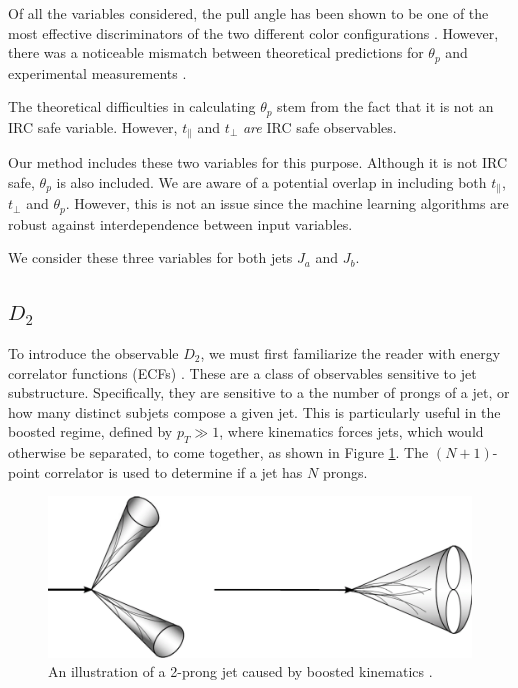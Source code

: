 \documentclass[10pt,a4paper]{book}
\begin{document}
Of all the variables considered, the pull angle has been shown to be one of the most effective discriminators of the two different color configurations \cite{Gallicchio:2010sw}. However, there was a noticeable mismatch between theoretical predictions for $\theta_p$ and experimental measurements \cite{Larkoski:2019urm}. 

The theoretical difficulties in calculating $\theta_p$ stem from the fact that it is not an IRC safe variable. However, $t_\parallel$ and $t_\perp$ \emph{are} IRC safe observables. 

Our method includes these two variables for this purpose. Although it is not IRC safe, $\theta_p$ is also included. We are aware of a potential overlap in including both $t_\parallel$, $t_\perp$ and $\theta_p$. However, this is not an issue since the machine learning algorithms are robust against interdependence between input variables. 

We consider these three variables for both jets $J_a$ and $J_b$. 

\subsection{$D_2$}

To introduce the observable $D_2$, we must first familiarize the reader with energy correlator functions (ECFs) \cite{Larkoski:2013eya}. These are a class of observables sensitive to jet substructure. Specifically, they are sensitive to a the number of prongs of a jet, or how many distinct subjets compose a given jet. This is particularly useful in the boosted regime, defined by $p_T \gg 1$, where kinematics forces jets, which would otherwise be separated, to come together, as shown in Figure \ref{two pronged boost}. The $(N+1)$-point correlator is used to determine if a jet has $N$ prongs.

\begin{figure}[ht]
\centering
\includegraphics[scale=0.35]{ch4_images/two_prong}
\caption{An illustration of a 2-prong jet caused by boosted kinematics \cite{jet_image}.}
\label{two pronged boost}
\end{figure}
\end{document}
